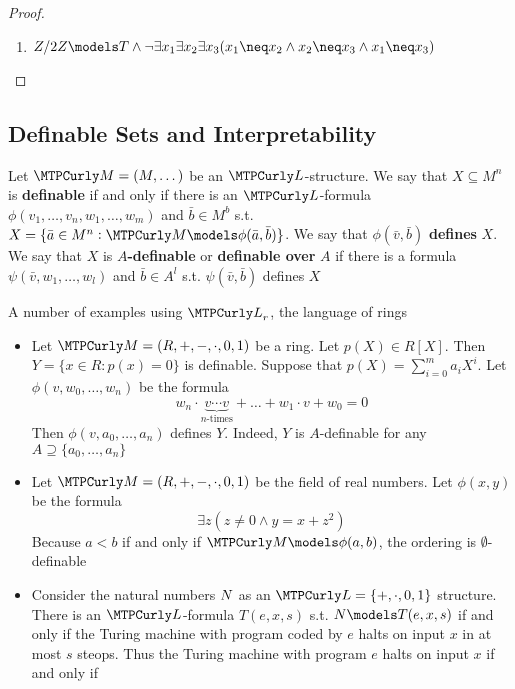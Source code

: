 \documentclass[11pt]{article}
\begin{document}
\begin{proof}
\begin{enumerate}
\item \(\Z/2\Z\models T\wedge\neg\exists x_1\exists x_2\exists x_3(x_1\neq x_2\wedge
      x_2\neq x_3\wedge x_1\neq x_3)\)
\end{enumerate}
\end{proof}
\subsection{Definable Sets and Interpretability}
\label{sec:orgaf58e3b}
\begin{definition}[]
Let \(\calm=(M,\dots)\) be an \(\call\)-structure. We say that \(X\subseteq M^n\)
is \textbf{definable} if and only if there is an \(\call\)-formula 
\(\phi(v_1,\dots,v_n,w_1,\dots,w_m)\) and \(\bar{b}\in M^b\) s.t. 
\(X=\{\bar{a}\in M^n:\calm\models\phi(\bar{a},\bar{b})\}\). We say that
\(\phi(\bar{v},\bar{b})\) \textbf{defines} \(X\). We say that \(X\) is
\textbf{\(A\)-definable} or \textbf{definable over}  \(A\) if there is a formula 
\(\psi(\bar{v},w_1,\dots,w_l)\) and \(\bar{b}\in A^l\) s.t.
\(\psi(\bar{v},\bar{b})\) defines \(X\)
\end{definition}

A number of examples using \(\call_r\), the language of rings
\begin{itemize}
\item Let \(\calm=(R,+,-,\cdot,0,1)\) be a ring. Let \(p(X)\in R[X]\). Then 
\(Y=\{x\in R:p(x)=0\}\) is definable. Suppose that
\(p(X)=\displaystyle\sum_{i=0}^ma_iX^i\). Let \(\phi(v,w_0,\dots,w_n)\) be the
formula
\begin{equation*}
w_n\cdot\underbrace{v\cdots v}_{n\text{-times}}+\dots+w_1\cdot v+w_0=0
\end{equation*}
Then \(\phi(v,a_0,\dots,a_n)\) defines \(Y\). Indeed, \(Y\) is \(A\)-definable
for any \(A\supseteq\{a_0,\dots,a_n\}\)
\item Let \(\calm=(\R,+,-,\cdot,0,1)\) be the field of real numbers. Let
\(\phi(x,y)\) be the formula 
\begin{equation*}
\exists z(z\neq 0\wedge y=x+z^2)
\end{equation*}
Because \(a<b\) if and only if \(\calm\models\phi(a,b)\), the ordering is
\(\emptyset\)-definable
\item Consider the natural numbers \(\relax{N}\) as an \(\call=\{+,\cdot,0,1\}\) structure.
There is an \(\call\)-formula \(T(e,x,s)\) s.t. \(\N\models T(e,x,s)\) if and
only if the Turing machine with program coded by \(e\) halts on input \(x\) in
at most \(s\) steops. Thus the Turing machine with program \(e\) halts on input
\(x\) if and only if
\end{itemize}
\end{document}
